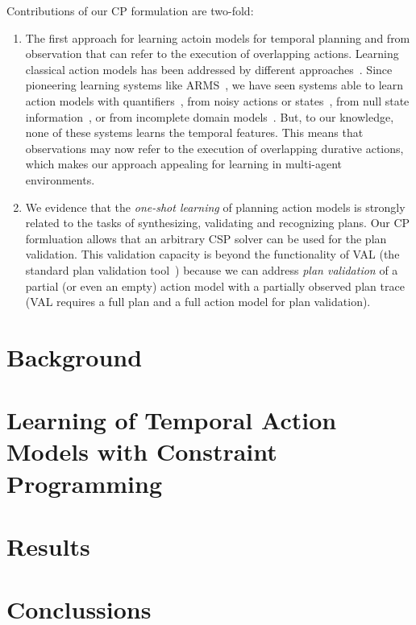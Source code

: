 \documentclass{ecai}
\begin{document}
Contributions of our CP formulation are two-fold:
\begin{enumerate}  
\item The first approach for learning actoin models for temporal planning and from observation that can refer to the execution of overlapping actions. Learning classical action models has been addressed by different approaches~\cite{arora2018review}. Since pioneering learning systems like ARMS~\cite{yang2007learning}, we have seen systems able to learn action models with quantifiers~\cite{AmirC08,ZhuoYHL10}, from noisy actions or states~\cite{MouraoZPS12,zhuo2013action}, from null state information~\cite{cresswell2013}, or from incomplete domain models~\cite{ZhuoK17,ZhuoNK13}. But, to our knowledge, none of these systems learns the temporal features. This means that observations may now refer to the execution of overlapping durative actions, which makes our approach appealing for learning in multi-agent environments.
\item We evidence that the {\em one-shot learning} of planning  action models is strongly related to the tasks of synthesizing, validating and recognizing plans. Our CP formluation allows that an arbitrary CSP solver can be used for the plan validation.  This validation capacity is beyond the functionality of VAL (the standard plan validation tool~\cite{howey2004val}) because we can address {\em plan validation} of a partial (or even an empty) action model with a partially observed plan trace (VAL requires a full plan and a full action model for plan validation).
\end{enumerate}


\section{Background}


\section{Learning of Temporal Action Models with Constraint Programming}

\section{Results}

\section{Conclussions}
  



\end{document}
